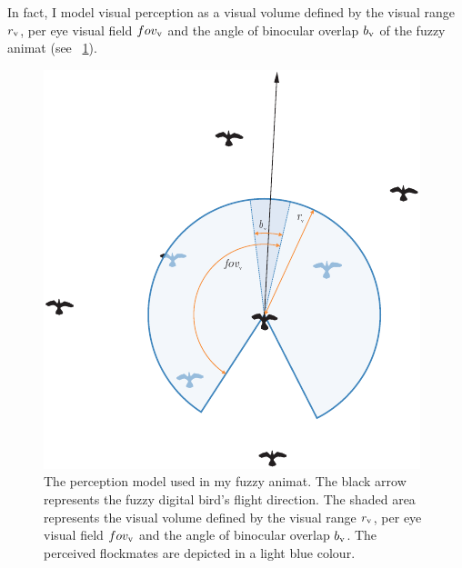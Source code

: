 In fact, I model visual perception as a visual volume defined by the visual range $r_\textnormal{v}$, per eye visual field $fov_\textnormal{v}$ and the angle of binocular overlap $b_\textnormal{v}$ of the fuzzy animat (see \fig~\ref{fig:perception:afd}).
%
\begin{figure}%
\includegraphics{fig[perception]afd}
\caption{The perception model used in my fuzzy animat. The black arrow represents the fuzzy digital bird's flight direction. The shaded area represents the visual volume defined by the visual range $r_\textnormal{v}$, per eye visual field $fov_\textnormal{v}$ and the angle of binocular overlap $b_\textnormal{v}$. The perceived flockmates are depicted in a light blue colour.}
\label{fig:perception:afd}
\end{figure}
%
